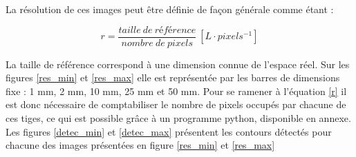 \documentclass[11pt,letterpaper]{article}
\begin{document}
La résolution de ces images peut être définie de façon générale comme étant : 

\begin{equation}
    r = \frac{taille \: de \: r\textit{é}f\textit{é}rence}{nombre \: de \: pixels} \: [L\cdot pixels^{-1}]
    \label{r}
\end{equation}

La taille de référence correspond à une dimension connue de l'espace réel. Sur les figures \ref{res_min} et \ref{res_max} elle est représentée par les barres de dimensions fixe : 1 mm, 2 mm, 10 mm, 25 mm et 50 mm. Pour se ramener à l'équation \ref{r} il est donc nécessaire de comptabiliser le nombre de pixels occupés par chacune de ces tiges, ce qui est possible grâce à un programme python, disponible en annexe. Les figures \ref{detec_min} et \ref{detec_max} présentent les contours détectés pour chacune des images présentées en figure \ref{res_min} et \ref{res_max}
\end{document}
